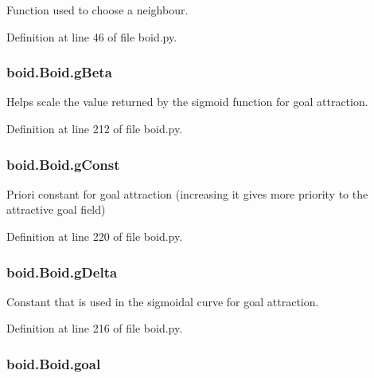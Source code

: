 Function used to choose a neighbour. 



Definition at line 46 of file boid.\-py.

\hypertarget{classboid_1_1Boid_a2c33a265be5079b7b916be49933eccaf}{
\subsubsection[{g\-Beta}]{\setlength{\rightskip}{0pt plus 5cm}boid.\-Boid.\-g\-Beta}}\label{classboid_1_1Boid_a2c33a265be5079b7b916be49933eccaf}


Helps scale the value returned by the sigmoid function for goal attraction. 



Definition at line 212 of file boid.\-py.

\hypertarget{classboid_1_1Boid_a71d768a5bc70ecfcaec719cfd0c310ef}{
\subsubsection[{g\-Const}]{\setlength{\rightskip}{0pt plus 5cm}boid.\-Boid.\-g\-Const}}\label{classboid_1_1Boid_a71d768a5bc70ecfcaec719cfd0c310ef}


Priori constant for goal attraction (increasing it gives more priority to the attractive goal field) 



Definition at line 220 of file boid.\-py.

\hypertarget{classboid_1_1Boid_a17cd80cfac0fb27106c12e45929f9a9f}{
\subsubsection[{g\-Delta}]{\setlength{\rightskip}{0pt plus 5cm}boid.\-Boid.\-g\-Delta}}\label{classboid_1_1Boid_a17cd80cfac0fb27106c12e45929f9a9f}


Constant that is used in the sigmoidal curve for goal attraction. 



Definition at line 216 of file boid.\-py.

\hypertarget{classboid_1_1Boid_afe8350d9d4c1eeb15a5df7337328e1c7}{
\subsubsection[{goal}]{\setlength{\rightskip}{0pt plus 5cm}boid.\-Boid.\-goal}}\label{classboid_1_1Boid_afe8350d9d4c1eeb15a5df7337328e1c7}


